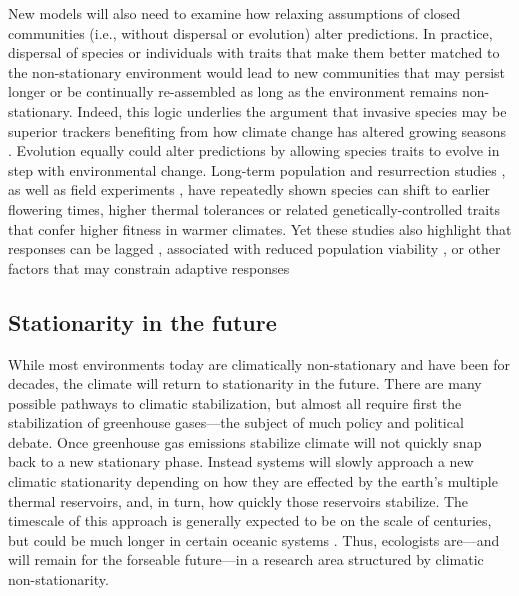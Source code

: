 \documentclass[11pt,letterpaper]{article}
\begin{document}
New models will also need to examine how relaxing assumptions of closed communities (i.e., without dispersal or evolution) alter predictions. In practice, dispersal of species or individuals with traits that make them better matched to the non-stationary environment would lead to new communities that may persist longer or be continually re-assembled as long as the environment remains non-stationary. Indeed, this logic underlies the argument that invasive species may be superior trackers benefiting from how climate change has altered growing seasons \citep{Willis:2010al,wolkovich:2010fee}. Evolution equally could alter predictions by allowing species traits to evolve in step with environmental change. Long-term population \citep[e.g.,][]{colautti2017} and resurrection studies \citep{wilczek2014,yousey2018}, as well as field experiments \citep{colautti2017,arab2019}, have repeatedly shown species can shift to earlier flowering times, higher thermal tolerances or related genetically-controlled traits that confer higher fitness in warmer climates. Yet these studies also highlight that responses can be lagged \citep[e.g.,][]{wilczek2014}, associated with reduced population viability \citep[e.g.,][]{colautti2017}, or other factors that may constrain adaptive responses

\subsection{Stationarity in the future}

While most environments today are climatically non-stationary and have been for decades, the climate will return to stationarity in the future. There are many possible pathways to climatic stabilization, but almost all require first the stabilization of greenhouse gases---the subject of much policy and political debate. Once greenhouse gas emissions stabilize climate will not quickly snap back to a new stationary phase. Instead systems will slowly approach a new climatic stationarity depending on how they are effected by the earth's multiple thermal reservoirs, and, in turn, how quickly those reservoirs stabilize. The timescale of this approach is generally expected to be on the scale of centuries, but could be much longer in certain oceanic systems \citep{ipcc2013ch12}. Thus, ecologists are---and will remain for the forseable future---in a research area structured by climatic non-stationarity. 
\end{document}

